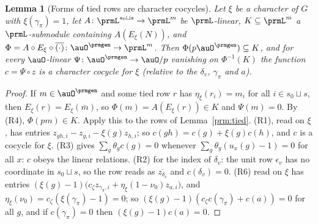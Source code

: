 \documentclass[10pt]{amsart}
\newtheorem{lemma}[theorem]{Lemma}
\theoremstyle{definition}
\theoremstyle{remark}
\begin{document}
\begin{lemma}[Forms of tied rows are character cocycles]\label{prm:forms}
Let $\xi$ be a character of $G$ with $\xi(\gamma_\pi)=1$, let $A\colon\prmL^{s_0\sqcup s}\to\prmL^m$
be $\prmL$-linear, $K\subseteq\prmL^m$ a $\prmL$-submodule containing $A(E_\xi(N))$, and $\Phi=A\circ
E_\xi\circ\overline{(\cdot)}\colon\auO^{\prmgen}\to\prmL^m$. Then $\Phi(p\auO^{\prmgen})\subseteq K$, and
for every $\auO$-linear $\Psi\colon\auO^{\prmgen}\to\auO/p$ vanishing on $\Phi^{-1}(K)$ the function
$c=\Psi\circ z$ is a character cocycle for $\xi$ (relative to the $\delta_v$, $\gamma_\pi$ and $a$).
\end{lemma}
\begin{proof}
If $m\in\auO^{\prmgen}$ and some tied row $r$ has $\eta_\xi(r_i)=m_i$ for all $i\in s_0\sqcup s$, then
$E_\xi(r)=E_\xi(\bar m)$, so $\Phi(m)=A(E_\xi(r))\in K$ and $\Psi(m)=0$. By (R4), $\Phi(pm)\in K$.
Apply this to the rows of Lemma~\ref{prm:tied}. (R1), read on $\xi$, has entries $z_{gh,i}-z_{g,i}-
\xi(g)z_{h,i}$; so $c(gh)=c(g)+\xi(g)c(h)$, and $c$ is a cocycle for $\xi$. (R3) gives $\sum_g\theta_g
c(g)=0$ whenever $\sum_g\theta_g(u_x(g)-1)=0$ for all $x$: $c$ obeys the linear relations. (R2) for the
index of $\delta_v$: the unit row $\epsilon_v$ has no coordinate in $s_0\sqcup s$, so the row reads as
$\overline{z_{\delta_v}}$ and $c(\delta_v)=0$. (R6) read on $\xi$ has entries $(\xi(g)-1)\bigl(c_\zeta z_{
\gamma_\pi,i}+\eta_\xi(1-\nu_0)z_{a,i}\bigr)$, and $\eta_\xi(\nu_0)=c_\zeta(\xi(\gamma_\pi)-1)=0$; so
$(\xi(g)-1)(c_\zeta c(\gamma_\pi)+c(a))=0$ for all $g$, and if $c(\gamma_\pi)=0$ then $(\xi(g)-1)c(a)=0$.
\end{proof}
\end{document}
